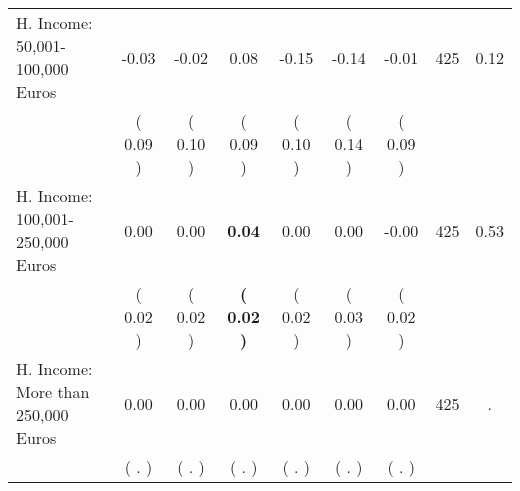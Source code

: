 \begin{tabular}{lcccccccc}
H. Income: 50,001-100,000 Euros &     -0.03 &     -0.02 &      0.08 &     -0.15 &     -0.14 &     -0.01 & 425 &       0.12 \\ 
 & (     0.09 ) & (     0.10 ) & (     0.09 ) & (     0.10 ) & (     0.14 ) & (     0.09 ) & \\
H. Income: 100,001-250,000 Euros &      0.00 &      0.00 & \textbf{     0.04} &      0.00 &      0.00 &     -0.00 & 425 &       0.53 \\ 
 & (     0.02 ) & (     0.02 ) & \textbf{(     0.02 )} & (     0.02 ) & (     0.03 ) & (     0.02 ) & \\
H. Income: More than 250,000 Euros &      0.00 &      0.00 &      0.00 &      0.00 &      0.00 &      0.00 & 425 &          . \\ 
 & (        . ) & (        . ) & (        . ) & (        . ) & (        . ) & (        . ) & \\
\bottomrule
\end{tabular}
